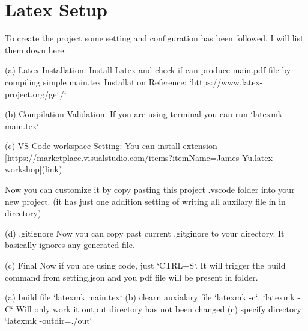 
\chapter{Latex Setup}


\begin{text-note}

To create the project some setting and configuration has been followed. I will list them down here.

(a) Latex Installation: Install Latex and check if can produce main.pdf file by compiling simple main.tex
Installation Reference: `https://www.latex-project.org/get/`

(b) Compilation Validation: If you are using terminal you can run `latexmk main.tex` 

(c) VS Code workspace Setting: 
You can install extension [https://marketplace.visualstudio.com/items?itemName=James-Yu.latex-workshop](link)

Now you can customize it by copy pasting this project .vscode folder into your new project.
(it has just one addition setting of writing all auxilary file in in  \out directory)

(d) .gitignore
Now you can copy past current .gitginore to your directory.
It basically ignores any generated file.

(c) Final
Now if you are using code, just `CTRL+S`.
It will trigger the build command from setting.json and you pdf file will be present in \out folder.

\end{text-note}

\begin{text-note}
    
    (a) build file `latexmk main.tex`
    (b) clearn auxialary file `latexmk -c`, `latexmk -C`
        Will only work it output directory has not been changed
    (c) specify \out directory `latexmk -outdir=./out`
\end{text-note}
